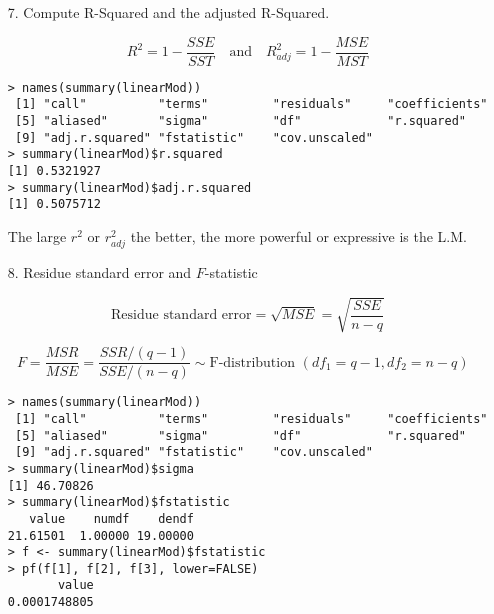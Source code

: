 \begin{frame}[fragile]

	\begin{enumerate}
		\item[7.] Compute R-Squared and the adjusted R-Squared.
			\vfill
		\item[]
			\[
				R^2 = 1-\frac{SSE}{SST} \quad \text{and}\quad
				R^2_{adj} = 1-\frac{MSE}{MST}
		\]
		\vfill
		\item[]
			\begin{center}
				\begin{minipage}{0.7\textwidth}
\begin{lstlisting}
> names(summary(linearMod))
 [1] "call"          "terms"         "residuals"     "coefficients"
 [5] "aliased"       "sigma"         "df"            "r.squared"
 [9] "adj.r.squared" "fstatistic"    "cov.unscaled"
> summary(linearMod)$r.squared
[1] 0.5321927
> summary(linearMod)$adj.r.squared
[1] 0.5075712
\end{lstlisting}
				\end{minipage}
			\end{center}
			\vfill
		\item[] The large $r^2$ or $r^2_{adj}$ the better, the more powerful or expressive is the L.M.
\end{enumerate}
\end{frame}
\begin{frame}[fragile]

	\begin{enumerate}
		\item[8.] Residue standard error and $F$-statistic
			\vfill
		\item[]
			\[
				\text{Residue standard error} = \sqrt{MSE} = \sqrt{\frac{SSE}{n-q}}
			\]
\vfill
		\item[]
			\[
				F = \frac{MSR}{MSE} = \frac{SSR/(q-1)}{SSE/(n-q)}\sim \text{F-distribution $(df_1 = q-1, df_2 = n-q)$ }
			\]
\vfill
\item[]
	\begin{center}
		\begin{minipage}{0.7\textwidth}
\begin{lstlisting}
> names(summary(linearMod))
 [1] "call"          "terms"         "residuals"     "coefficients"
 [5] "aliased"       "sigma"         "df"            "r.squared"
 [9] "adj.r.squared" "fstatistic"    "cov.unscaled"
> summary(linearMod)$sigma
[1] 46.70826
> summary(linearMod)$fstatistic
   value    numdf    dendf
21.61501  1.00000 19.00000
> f <- summary(linearMod)$fstatistic
> pf(f[1], f[2], f[3], lower=FALSE)
       value
0.0001748805
\end{lstlisting}
		\end{minipage}
	\end{center}
	\end{enumerate}
\end{frame}
